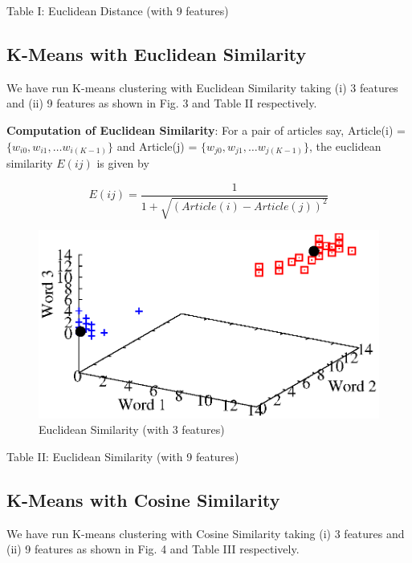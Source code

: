 \documentclass[journal,onecolumn]{IEEEtran}
\begin{document}
{Table I: Euclidean Distance (with 9 features) \label{euclid_default_10}


\subsection{K-Means with Euclidean Similarity}
We have run K-means clustering with Euclidean Similarity taking (i) 3 features and (ii) 9 features as shown in Fig. 3 and Table II respectively.

\textbf{Computation of Euclidean Similarity}: For a pair of articles say, Article(i) = $\{w_{i0}, w_{i1}, \dots w_{i(K-1)} \}$ and Article(j) = $\{w_{j0}, w_{j1}, \dots w_{j(K-1)} \}$, the euclidean similarity $E(ij)$ is given by

\begin{equation} \label{euclid_sim_eq}
E(ij) = \frac{1}{1 + \sqrt{(Article(i) - Article(j))^2}}
\end{equation}

\begin{figure}[h] \label{euclid_sim}
\begin{center}
 \includegraphics[scale=.70] {Plots/euclid_sim.eps}
 \caption { Euclidean Similarity (with 3 features)}
 \end{center}
\end{figure}

{Table II: Euclidean Similarity (with 9 features) \label{euclid_sim_10}}

\subsection{K-Means with Cosine Similarity}
We have run K-means clustering with Cosine Similarity taking (i) 3 features and (ii) 9 features as shown in Fig. 4 and Table III respectively.

}
\end{document}
